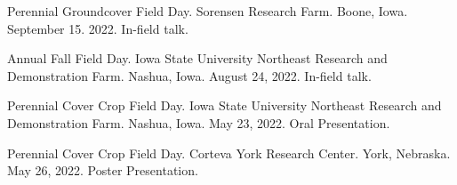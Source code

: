 

\begin{cvparagraph}

Perennial Groundcover Field Day. Sorensen Research Farm. Boone, Iowa. September 15. 2022. In-field talk.

Annual Fall Field Day. Iowa State University Northeast Research and Demonstration Farm. Nashua, Iowa. August 24, 2022. In-field talk. 

Perennial Cover Crop Field Day. Iowa State University Northeast Research and Demonstration Farm. Nashua, Iowa. May 23, 2022. Oral Presentation.

Perennial Cover Crop Field Day. Corteva York Research Center. York, Nebraska. May 26, 2022. Poster Presentation.

\end{cvparagraph}